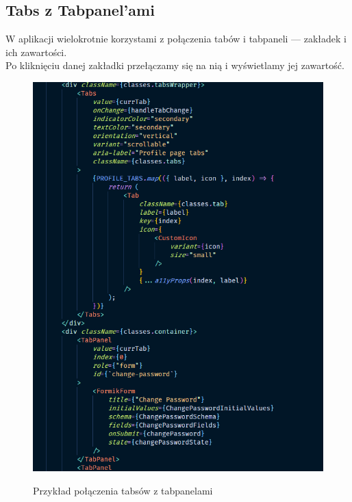 \documentclass[a4paper,11pt]{report}
\begin{document}
\subsection{Tabs z Tabpanel'ami}
\label{subsec:tabs}
W aplikacji wielokrotnie korzystami z połączenia tabów i tabpaneli — zakładek i ich zawartości.\\
Po kliknięciu danej zakładki przełączamy się na nią i wyświetlamy jej zawartość.
\begin{figure}[H]
	\centering
	\includegraphics[scale=0.5]{implementacja/frontend/tabs}\\
	\caption{Przykład połączenia tabsów z tabpanelami}
	\label{fig:tabs}
\end{figure}
\end{document}
